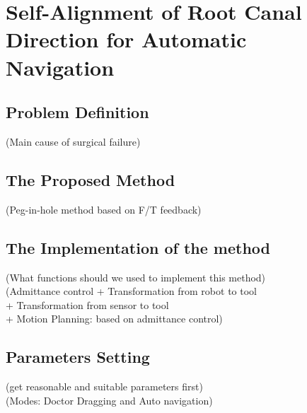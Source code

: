 \chapter{Self-Alignment of Root Canal Direction for Automatic Navigation}
\section{Problem Definition}
(Main cause of surgical failure)
\section{The Proposed Method}
(Peg-in-hole method based on F/T feedback)
\section{The Implementation of the method}
(What functions should we used to implement this method)\\
(Admittance control + Transformation from robot to tool \\
+ Transformation from sensor to tool					\\
+ Motion Planning: based on admittance control)														
\newpage
\section{Parameters Setting}
(get reasonable and suitable parameters first)			\\
(Modes: Doctor Dragging and Auto navigation)																							